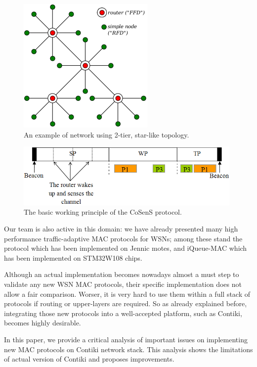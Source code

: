 \documentclass[12pt,a4paper]{article}
\begin{document}
\begin{figure}[!t]
\centering
\includegraphics{star-topo-net.png}
\caption{An example of network using 2-tier, star-like topology.}
\label{star-topo-net}
\end{figure}
\hfil
\begin{figure}[!t]
\centering
\includegraphics[width=11cm]{superframe.png}
\caption{The basic working principle of the CoSenS protocol.}
\label{cosens-principle}
\end{figure}

Our team is also active in this domain: we have already presented many
high performance traffic-adaptive MAC protocols for WSNs; among these stand
the  \cite{cosens} protocol which has been implemented on
Jennic motes, and iQueue-MAC \cite{iqueue-mac} which has been implemented
on STM32W108 chips.

Although an actual implementation becomes nowadays almost a must step
to validate any new WSN MAC protocols, their specific implementation
does not allow a fair comparison. Worser, it is very hard to use them
within a full stack of protocols if routing or upper-layers are required.
So as already explained before, integrating those new protocols into
a well-accepted platform, such as Contiki, becomes highly desirable.

In this paper, we provide a critical analysis of important issues on
implementing new MAC protocols on Contiki network stack. This analysis
shows the limitations of actual version of Contiki and proposes improvements.
\end{document}
